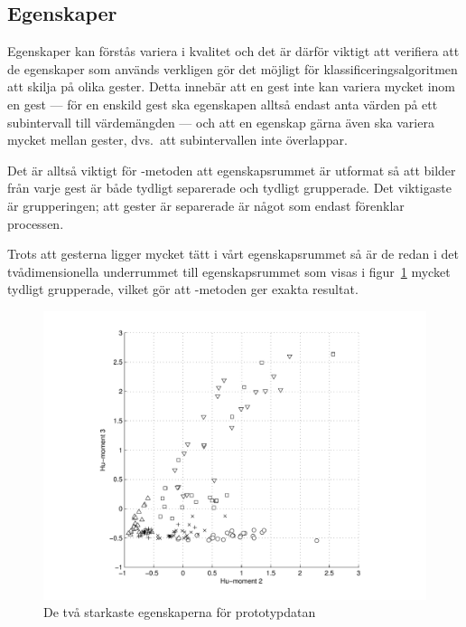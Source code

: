 \documentclass[../rapport_MVEX01-11-05]{subfiles}
\begin{document}
\subsection{Egenskaper}\label{sec:resultat_features}

Egenskaper kan förstås variera i kvalitet och det är därför viktigt att
verifiera att de egenskaper som används verkligen gör det möjligt för
klassificeringsalgoritmen att skilja på olika gester. Detta innebär att en
gest inte kan variera mycket inom en gest --- för en enskild gest ska 
egenskapen alltså endast anta värden på ett subintervall till värdemängden ---
och att en egenskap gärna även ska variera mycket mellan gester, dvs.~att
subintervallen inte överlappar.

Det är alltså viktigt för \knn-metoden att
egenskapsrummet är utformat så att bilder från varje gest är både tydligt
separerade och tydligt grupperade. Det viktigaste är grupperingen; att gester
är separerade är något som endast förenklar processen.

Trots att gesterna ligger mycket tätt i vårt egenskapsrummet så är de redan i det
tvådimensionella underrummet till egenskapsrummet som visas i figur~\ref{fig:feats1011}
mycket tydligt grupperade, vilket gör att \knn-metoden ger exakta resultat.

\begin{figure}[htb]
  \centering
  \includegraphics[width=\textwidth,trim=2cm 0.5cm 2cm 0]{bilder/feats-10+11}
  \caption{De två starkaste egenskaperna för prototypdatan}
  \label{fig:feats1011}
\end{figure}
\end{document}
